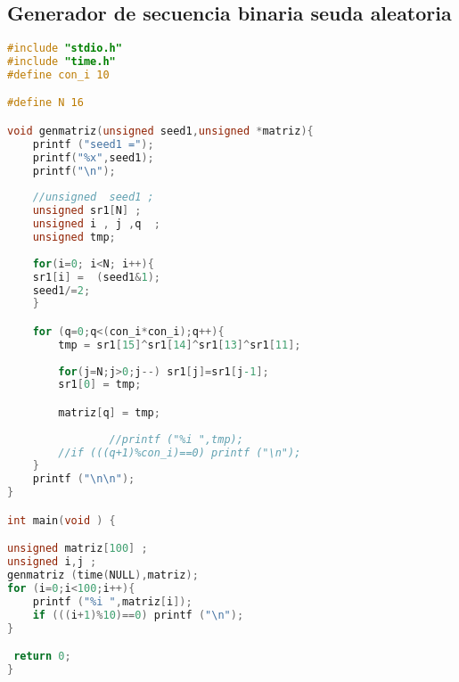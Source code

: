  \subsection{Generador de secuencia binaria seuda aleatoria}
\begin{lstlisting}[language=C,frame=single]
#include "stdio.h"
#include "time.h"
#define con_i 10

#define N 16

void genmatriz(unsigned seed1,unsigned *matriz){
    printf ("seed1 ="); 
    printf("%x",seed1);
    printf("\n");   
    
    //unsigned  seed1 ; 
    unsigned sr1[N] ;
    unsigned i , j ,q  ;
    unsigned tmp;    
    
    for(i=0; i<N; i++){
  	sr1[i] =  (seed1&1);
  	seed1/=2;
    }

    for (q=0;q<(con_i*con_i);q++){
		tmp = sr1[15]^sr1[14]^sr1[13]^sr1[11];
		
		for(j=N;j>0;j--) sr1[j]=sr1[j-1];
		sr1[0] = tmp;

		matriz[q] = tmp;
		
                //printf ("%i ",tmp);
		//if (((q+1)%con_i)==0) printf ("\n");
    }   
	printf ("\n\n");
}

int main(void ) {

unsigned matriz[100] ;
unsigned i,j ;
genmatriz (time(NULL),matriz);
for (i=0;i<100;i++){
	printf ("%i ",matriz[i]);
	if (((i+1)%10)==0) printf ("\n");
}

 return 0;
}
\end{lstlisting}

